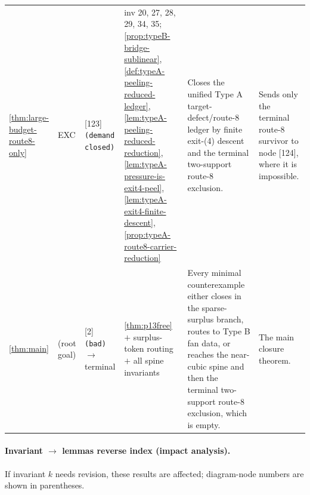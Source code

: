 \documentclass[11pt]{article}
\begin{document}
{\begin{longtable}{L{0.10\textwidth} C{0.045\textwidth} L{0.13\textwidth} L{0.135\textwidth} L{0.28\textwidth} L{0.20\textwidth}}
\cref{thm:large-budget-route8-only} & EXC & [123] \texttt{(demand closed)} & inv 20, 27, 28, 29, 34, 35; \cref{prop:typeB-bridge-sublinear}, \cref{def:typeA-peeling-reduced-ledger}, \cref{lem:typeA-peeling-reduced-reduction}, \cref{lem:typeA-pressure-is-exit4-peel}, \cref{lem:typeA-exit4-finite-descent}, \cref{prop:typeA-route8-carrier-reduction} & Closes the unified Type A target-defect/route-8 ledger by finite exit-\textup{(4)} descent and the terminal two-support route-8 exclusion. & Sends only the terminal route-8 survivor to node [124], where it is impossible. \\
\cref{thm:main} & (root goal) & [2] \texttt{(bad)} $\to$ terminal & \cref{thm:p13free} $+$ surplus-token routing $+$ all spine invariants & Every minimal counterexample either closes in the sparse-surplus branch, routes to Type B fan data, or reaches the near-cubic spine and then the terminal two-support route-8 exclusion, which is empty. & The main closure theorem. \\
\bottomrule
\end{longtable}
}

\paragraph{Invariant $\to$ lemmas reverse index (impact analysis).}
If invariant $k$ needs revision, these results are affected; diagram-node numbers are shown in parentheses.
\end{document}
